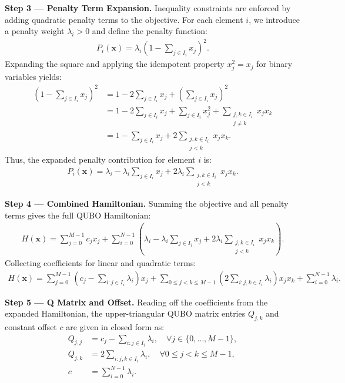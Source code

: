 \documentclass[12pt]{article}
\begin{document}
\textbf{Step 3 --- Penalty Term Expansion.} Inequality constraints are enforced by adding quadratic penalty terms to the objective. For each element $i$, we introduce a penalty weight $\lambda_i > 0$ and define the penalty function:
\begin{align}
P_i(\mathbf{x}) = \lambda_i \left(1 - \sum_{j \in I_i} x_j\right)^2.
\end{align}
Expanding the square and applying the idempotent property $x_j^2 = x_j$ for binary variables yields:
\begin{align}
\left(1 - \sum_{j \in I_i} x_j\right)^2 &= 1 - 2\sum_{j \in I_i} x_j + \left(\sum_{j \in I_i} x_j\right)^2 \\
&= 1 - 2\sum_{j \in I_i} x_j + \sum_{j \in I_i} x_j^2 + \sum_{\substack{j,k \in I_i \\ j \neq k}} x_j x_k \\
&= 1 - \sum_{j \in I_i} x_j + 2\sum_{\substack{j,k \in I_i \\ j < k}} x_j x_k.
\end{align}
Thus, the expanded penalty contribution for element $i$ is:
\begin{align}
P_i(\mathbf{x}) = \lambda_i - \lambda_i \sum_{j \in I_i} x_j + 2\lambda_i \sum_{\substack{j,k \in I_i \\ j < k}} x_j x_k.
\end{align}

\textbf{Step 4 --- Combined Hamiltonian.} Summing the objective and all penalty terms gives the full QUBO Hamiltonian:
\begin{align}
H(\mathbf{x}) = \sum_{j=0}^{M-1} c_j x_j + \sum_{i=0}^{N-1} \left( \lambda_i - \lambda_i \sum_{j \in I_i} x_j + 2\lambda_i \sum_{\substack{j,k \in I_i \\ j < k}} x_j x_k \right).
\end{align}
Collecting coefficients for linear and quadratic terms:
\begin{align}
H(\mathbf{x}) = \sum_{j=0}^{M-1} \left( c_j - \sum_{i: j \in I_i} \lambda_i \right) x_j + \sum_{0 \le j < k \le M-1} \left( 2 \sum_{i: j,k \in I_i} \lambda_i \right) x_j x_k + \sum_{i=0}^{N-1} \lambda_i.
\end{align}

\textbf{Step 5 --- Q Matrix and Offset.} Reading off the coefficients from the expanded Hamiltonian, the upper-triangular QUBO matrix entries $Q_{j,k}$ and constant offset $c$ are given in closed form as:
\begin{align}
Q_{j,j} &= c_j - \sum_{i: j \in I_i} \lambda_i, \quad \forall j \in \{0, \dots, M-1\}, \\
Q_{j,k} &= 2 \sum_{i: j,k \in I_i} \lambda_i, \quad \forall 0 \le j < k \le M-1, \\
c &= \sum_{i=0}^{N-1} \lambda_i.
\end{align}
\end{document}
